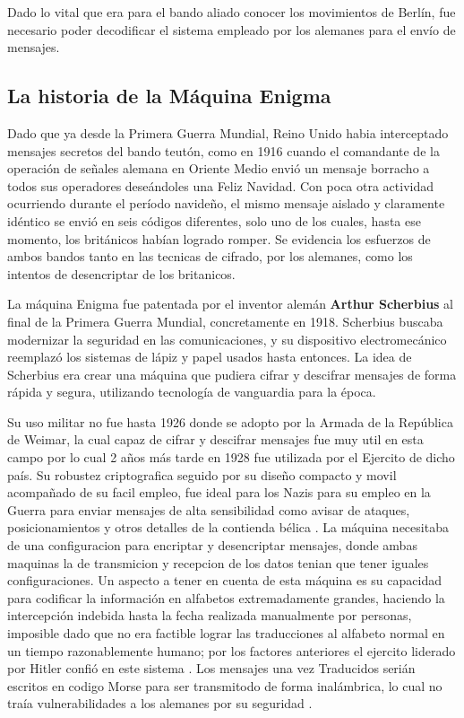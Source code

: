 \documentclass{article}
\begin{document}
Dado lo vital que era para el bando aliado conocer los movimientos de Berlín, fue necesario 
poder decodificar el sistema empleado por los alemanes para el envío de mensajes.


\subsection{La historia de la Máquina Enigma}

Dado que ya desde la Primera Guerra Mundial, Reino Unido 
habia interceptado mensajes secretos del bando teutón, como en 
1916 cuando el comandante de la operación de señales alemana en Oriente 
Medio envió un mensaje borracho a todos sus operadores deseándoles una 
Feliz Navidad. Con poca otra actividad ocurriendo durante el 
período navideño, el mismo mensaje aislado y claramente 
idéntico se envió en seis códigos diferentes, solo uno de 
los cuales, hasta ese momento, los británicos habían logrado 
romper. \cite{Colossus2} %
Se evidencia los esfuerzos de ambos bandos 
tanto en las tecnicas de cifrado, por los alemanes,
como los intentos de desencriptar de los britanicos. 



La máquina Enigma fue patentada por el inventor alemán 
\textbf{Arthur Scherbius} al final de la Primera Guerra Mundial, 
concretamente en 
 1918. Scherbius buscaba modernizar la seguridad en las 
 comunicaciones, y su dispositivo electromecánico reemplazó 
 los sistemas de lápiz y papel usados hasta entonces. La idea 
 de Scherbius era crear una máquina que pudiera cifrar y 
 descifrar mensajes de forma rápida y segura, utilizando 
 tecnología de vanguardia para la época. \cite{EnigmaC} \cite{Colossus1} %

Su uso militar no fue hasta 1926 donde se adopto por la Armada 
de la República de Weimar, la cual capaz de cifrar y descifrar 
mensajes fue muy util en esta campo por lo cual 2 años más tarde en 1928
fue utilizada por el Ejercito de dicho país. Su robustez criptografica seguido por su diseño compacto y 
movil acompañado de su facil empleo, fue ideal para los Nazis para su empleo en la Guerra
para enviar mensajes de alta sensibilidad como avisar de ataques, posicionamientos
y otros detalles de la contienda bélica \cite{AlanTuringEnigmaO} \cite{Colossus2}. La máquina necesitaba de 
una configuracion para encriptar y desencriptar mensajes\cite{EnigmaC200s}, donde ambas maquinas
la de transmicion y recepcion de los datos tenian que tener iguales configuraciones.
Un aspecto a tener en cuenta de esta máquina es su capacidad para codificar 
la información en alfabetos extremadamente grandes, haciendo la intercepción indebida
hasta la fecha realizada manualmente por personas, imposible dado que no era factible
lograr las traducciones al alfabeto normal en un tiempo razonablemente humano; por los factores anteriores
el ejercito liderado por Hitler confió en este sistema \cite{EnigmaC200s} \cite{AlanTuringEnigmaO}\cite{Colossus2}. 
Los mensajes una vez  Traducidos  serián escritos en codigo Morse para ser 
transmitodo de forma inalámbrica, lo cual no traía vulnerabilidades a los alemanes por su seguridad \cite{ColossusO} \cite{EnigmaC200s}.
\end{document}
